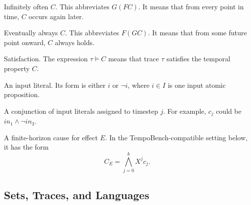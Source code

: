 \documentclass[11pt]{article}
\theoremstyle{remark}
\begin{document}
\begin{description}[leftmargin=2.8cm,style=nextline]
  \item[\(GF\,C\)]
  Infinitely often \(C\). This abbreviates \(G(F C)\). It means that from every
  point in time, \(C\) occurs again later.

  \item[\(FG\,C\)]
  Eventually always \(C\). This abbreviates \(F(G C)\). It means that from some
  future point onward, \(C\) always holds.

  \item[\(\models\)]
  Satisfaction. The expression \(\tau\models C\) means that trace \(\tau\)
  satisfies the temporal property \(C\).

  \item[\(\ell\)]
  An input literal. Its form is either \(i\) or \(\neg i\), where \(i\in I\) is
  one input atomic proposition.

  \item[\(c_j\)]
  A conjunction of input literals assigned to timestep \(j\). For example,
  \(c_j\) could be \(in_1\land \neg in_3\).

  \item[\(C_E\)]
  A finite-horizon cause for effect \(E\). In the TempoBench-compatible setting
  below, it has the form
  \[
    C_E=\bigwedge_{j=0}^{k} X^j c_j .
  \]
\end{description}

\subsection*{Sets, Traces, and Languages}
\end{document}
